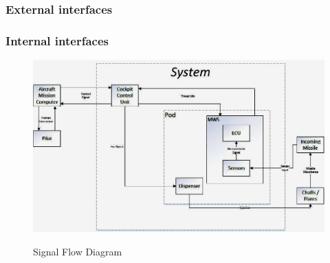 \subsubsection{External interfaces}

\subsubsection{Internal interfaces}

\begin{figure}[h]
	\centering
	\includegraphics[scale=0.5]{./images/SignalFlowDiagram}\\
	\caption{Signal Flow Diagram}
    \label{fig:sigFlowDiagram}
\end{figure}
